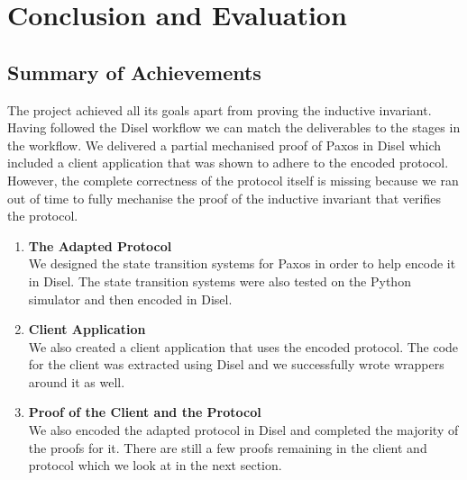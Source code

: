 \chapter{Conclusion and Evaluation}

\section{Summary of Achievements}
The project achieved all its goals apart from proving the inductive invariant.
Having followed the Disel workflow we can match the deliverables to the
stages in the workflow. We delivered a partial mechanised proof of Paxos in Disel
which included a client application that was shown to adhere to the encoded
protocol. However, the complete correctness of the protocol itself is missing
because we ran out of time to fully mechanise the proof of the inductive
invariant that verifies the protocol.

\begin{enumerate}
  \item \textbf{The Adapted Protocol} \\
    We designed the state transition systems for Paxos in order to help encode it in
    Disel. The state transition systems were also tested on the Python simulator
    and then encoded in Disel.
  \item \textbf{Client Application} \\
    We also created a client application that uses the encoded protocol. The
    code for the client was extracted using Disel and we successfully wrote
    wrappers around it as well.
  \item \textbf{Proof of the Client and the Protocol} \\
    We also encoded the adapted protocol in Disel and completed the majority
    of the proofs for it. There are still a few proofs remaining in the
    client and protocol which we look at in the next section.
\end{enumerate}

